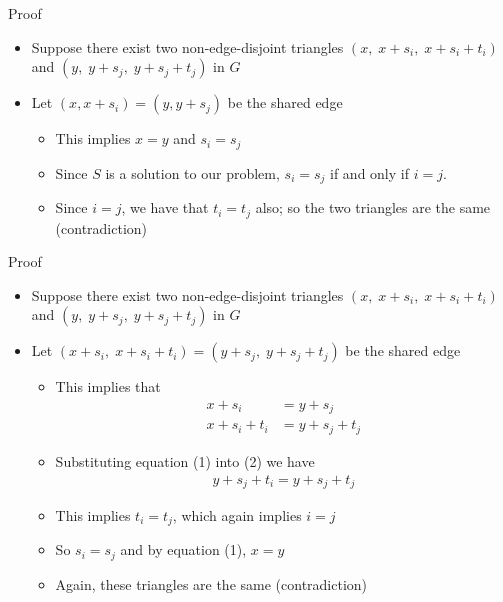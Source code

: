 \begin{frame}{Proof}
\begin{itemize}
	\item Suppose there exist two non-edge-disjoint triangles $(x,\; x+s_i,\; x+s_i+t_i)$ and $(y,\; y+s_j,\; y+s_j + t_j)$ in $G$
	\item Let $(x,x+s_i) = (y,y+s_j)$ be the shared edge
	\begin{itemize}
		\item This implies $x = y$ and $s_i = s_j$
		\item Since $S$ is a solution to our problem, $s_i = s_j$ if and only if $i = j$.
		\item Since $i = j$, we have that $t_i = t_j$ also; so the two triangles are the same (contradiction)
	\end{itemize}
\end{itemize}
\end{frame}

\begin{frame}{Proof}
\begin{itemize}
	\item Suppose there exist two non-edge-disjoint triangles $(x,\; x+s_i,\; x+s_i+t_i)$ and $(y,\; y+s_j,\; y+s_j + t_j)$ in $G$
	\item Let $(x+s_i,\; x+s_i+t_i) = (y + s_j,\; y+s_j+t_j)$ be the shared edge
	\begin{itemize}
		\item This implies that
		\begin{align}
			x+s_i &= y + s_j\\
			x+s_i+t_i &= y + s_j + t_j
		\end{align}
		\item Substituting equation (1) into (2) we have
		\begin{align*}
			y+s_j+t_i = y + s_j + t_j
		\end{align*}
		\item This implies $t_i = t_j$, which again implies $i = j$
		\item So $s_i = s_j$ and by equation (1), $x = y$
		\item Again, these triangles are the same (contradiction)
	\end{itemize}
\end{itemize}
\end{frame}

